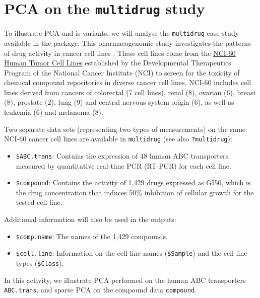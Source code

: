 \documentclass[]{book}
\begin{document}
\chapter{\texorpdfstring{PCA on the \texttt{multidrug}
study}{PCA on the multidrug study}}\label{pca-multidrug-case}

To illustrate PCA and is variants, we will analyse the
\texttt{multidrug} case study available in the package. This
pharmacogenomic study investigates the patterns of drug activity in
cancer cell lines \citep{Sza04}. These cell lines come from the
\href{https://dtp.cancer.gov/discovery_development/nci-60/}{NCI-60 Human
Tumor Cell Lines} established by the Developmental Therapeutics Program
of the National Cancer Institute (NCI) to screen for the toxicity of
chemical compound repositories in diverse cancer cell lines. NCI-60
includes cell lines derived from cancers of colorectal (7 cell lines),
renal (8), ovarian (6), breast (8), prostate (2), lung (9) and central
nervous system origin (6), as well as leukemia (6) and melanoma (8).

Two separate data sets (representing two types of measurements) on the
same NCI-60 cancer cell lines are available in \texttt{multidrug} (see
also \texttt{?multidrug}):

\begin{itemize}
\item
  \texttt{\$ABC.trans}: Contains the expression of 48 human ABC
  transporters measured by quantitative real-time PCR (RT-PCR) for each
  cell line.
\item
  \texttt{\$compound}: Contains the activity of 1,429 drugs expressed as
  GI50, which is the drug concentration that induces 50\% inhibition of
  cellular growth for the tested cell line.
\end{itemize}

Additional information will also be used in the outputs:

\begin{itemize}
\item
  \texttt{\$comp.name}: The names of the 1,429 compounds.
\item
  \texttt{\$cell.line}: Information on the cell line names
  (\texttt{\$Sample}) and the cell line types (\texttt{\$Class}).
\end{itemize}

In this activity, we illustrate PCA performed on the human ABC
transporters \texttt{ABC.trans}, and sparse PCA on the compound data
\texttt{compound}.
\end{document}
